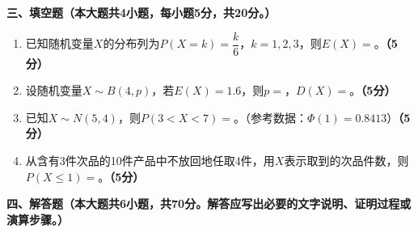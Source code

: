 \documentclass[12pt, a4paper]{ctexart}
\newcommand{\score}[1]{\hfill\textbf{（#1分）}}
\begin{document}
\vspace{0.5cm}

\noindent\textbf{三、填空题（本大题共4小题，每小题5分，共20分。）}

\vspace{0.3cm}

\begin{enumerate}[label=\textbf{\arabic*.}, leftmargin=2em, resume]

\item 已知随机变量$X$的分布列为$P(X=k) = \dfrac{k}{6}$，$k=1,2,3$，则$E(X) = $\hspace{2cm}。\score{5}

\item 设随机变量$X \sim B(4, p)$，若$E(X) = 1.6$，则$p = $\hspace{2cm}，$D(X) = $\hspace{2cm}。\score{5}

\item 已知$X \sim N(5, 4)$，则$P(3 < X < 7) = $\hspace{2cm}。（参考数据：$\Phi(1) = 0.8413$）\score{5}

\item 从含有3件次品的10件产品中不放回地任取4件，用$X$表示取到的次品件数，则$P(X \leqslant 1) = $\hspace{2cm}。\score{5}

\end{enumerate}

\newpage

\noindent\textbf{四、解答题（本大题共6小题，共70分。解答应写出必要的文字说明、证明过程或演算步骤。）}

\vspace{0.3cm}
\end{document}
